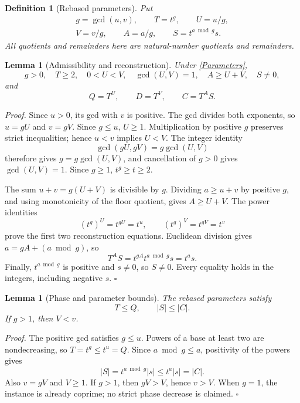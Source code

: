 \documentclass[11pt,letterpaper]{article}
\newtheorem{lemma}[theorem]{Lemma}
\newtheorem{definition}[theorem]{Definition}
\newenvironment{proof}{\noindent\textit{Proof.}}{\hfill\(\square\)}
\begin{document}
\begin{definition}[Rebased parameters]\label{RebaseDefinition}
Put
\[
\begin{gathered}
g=\gcd(u,v),\qquad T=t^g,\qquad U=u/g,\\
V=v/g,\qquad A=a/g,\qquad S=t^{a\bmod g}s.
\end{gathered}
\]
All quotients and remainders here are natural-number quotients and remainders.
\end{definition}

\begin{lemma}[Admissibility and reconstruction]\label{Reconstruction}
Under \eqref{Parameters},
\[
g>0,\quad T\ge2,\quad 0<U<V,\quad \gcd(U,V)=1,\quad
A\ge U+V,\quad S\ne0,
\]
and
\begin{equation}\label{IdenticalCoefficients}
Q=T^U,\qquad D=T^V,\qquad C=T^A S.
\end{equation}
\end{lemma}

\begin{proof}
Since \(u>0\), its gcd with \(v\) is positive. The gcd divides both exponents,
so \(u=gU\) and \(v=gV\). Since \(g\le u\), \(U\ge1\).
Multiplication by positive \(g\) preserves strict inequalities; hence
\(u<v\) implies \(U<V\). The integer identity
\[
\gcd(gU,gV)=g\gcd(U,V)
\]
therefore gives \(g=g\gcd(U,V)\), and cancellation of \(g>0\) gives
\(\gcd(U,V)=1\). Since \(g\ge1\), \(t^g\ge t\ge2\).

The sum \(u+v=g(U+V)\) is divisible by \(g\). Dividing \(a\ge u+v\) by
positive \(g\), and using monotonicity of the floor quotient, gives
\(A\ge U+V\). The power identities
\[
(t^g)^U=t^{gU}=t^u,\qquad (t^g)^V=t^{gV}=t^v
\]
prove the first two reconstruction equations. Euclidean division gives
\(a=gA+(a\bmod g)\), so
\[
T^A S=t^{gA}t^{a\bmod g}s=t^a s.
\]
Finally, \(t^{a\bmod g}\) is positive and \(s\ne0\), so \(S\ne0\).
Every equality holds in the integers, including negative \(s\).
\end{proof}

\begin{lemma}[Phase and parameter bounds]\label{Bounds}
The rebased parameters satisfy
\[
T\le Q,\qquad |S|\le |C|.
\]
If \(g>1\), then \(V<v\).
\end{lemma}

\begin{proof}
The positive gcd satisfies \(g\le u\). Powers of a base at least two are
nondecreasing, so \(T=t^g\le t^u=Q\).
Since \(a\bmod g\le a\), positivity of the powers gives
\[
|S|=t^{a\bmod g}|s|\le t^a|s|=|C|.
\]
Also \(v=gV\) and \(V\ge1\). If \(g>1\), then \(gV>V\), hence \(v>V\).
When \(g=1\), the instance is already coprime; no strict phase decrease is
claimed.
\end{proof}
\end{document}
